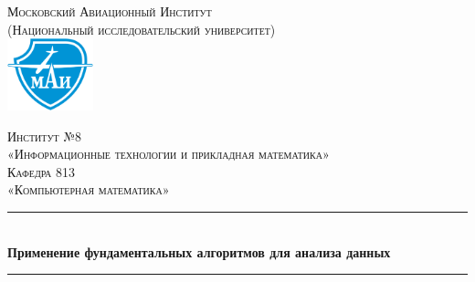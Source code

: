 \documentclass[a4paper,12pt]{article} %
\newcommand{\MAIITitle}{Московский Авиационный Институт \\ (Национальный исследовательский университет)}
\newcommand{\MAIInstitute}{8}
\newcommand{\MAIInstituteName}{Информационные технологии и прикладная математика}
\newcommand{\MAIDepartment}{813}
\newcommand{\MAIDepartmentName}{Компьютерная математика}
\begin{document}

\begin{titlepage}
	\newcommand{\HRule}{\rule{\linewidth}{0.5mm}} %
	
	\center
	
	
	\textsc{\large \MAIITitle}\\[1.25cm] %
	
	
	\includegraphics[width=2.5cm]{mai-logo.eps}
	
	
	\textsc{\Large Институт №\MAIInstitute \\ «\MAIInstituteName»}\\[0.5cm] %
	
	\textsc{\large Кафедра \MAIDepartment \\ «\MAIDepartmentName»}\\[0.5cm] %
	
	
	\HRule\\[0.4cm]
	
	{\huge\bfseries Применение фундаментальных алгоритмов для анализа данных}\\[0.5cm]
	
	\HRule\\[1.5cm]
	
	

\end{titlepage}
\end{document}
